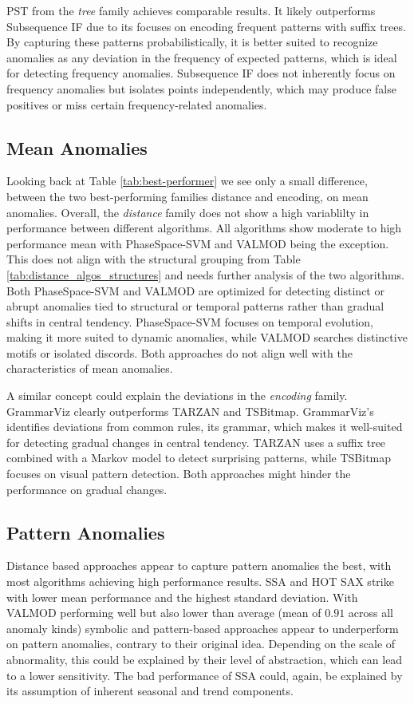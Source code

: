     PST from the \textit{tree} family achieves comparable results. It likely outperforms Subsequence IF due to its focuses on encoding frequent patterns with suffix trees. By capturing these patterns probabilistically, it is better suited to recognize anomalies as any deviation in the frequency of expected patterns, which is ideal for detecting frequency anomalies. Subsequence IF does not inherently focus on frequency anomalies but isolates points independently, which may produce false positives or miss certain frequency-related anomalies.
    
\subsection{Mean Anomalies} 
    
    Looking back at Table \ref{tab:best-performer} we see only a small difference, between the two best-performing families distance and encoding, on mean anomalies.
    Overall, the \textit{distance} family does not show a high variablilty in performance between different algorithms. All algorithms show moderate to high performance mean with PhaseSpace-SVM and VALMOD being the exception. This does not align with the structural grouping from Table \ref{tab:distance_algos_structures} and needs further analysis of the two algorithms. Both PhaseSpace-SVM and VALMOD are optimized for detecting distinct or abrupt anomalies tied to structural or temporal patterns rather than gradual shifts in central tendency. PhaseSpace-SVM focuses on temporal evolution, making it more suited to dynamic anomalies, while VALMOD searches distinctive motifs or isolated discords. Both approaches do not align well with the characteristics of mean anomalies.
    
    A similar concept could explain the deviations in the \textit{encoding} family. GrammarViz clearly outperforms TARZAN and TSBitmap. GrammarViz’s identifies deviations from common rules, its grammar, which makes it well-suited for detecting gradual changes in central tendency. TARZAN uses a suffix tree combined with a Markov model to detect surprising patterns, while TSBitmap focuses on visual pattern detection. Both approaches might hinder the performance on gradual changes.
    
\subsection{Pattern Anomalies}
    
    Distance based approaches appear to capture pattern anomalies the best, with most  algorithms achieving high performance results. SSA and HOT SAX strike with lower mean performance and the highest standard deviation.
    With VALMOD performing well but also lower than average (mean of $0.91$ across all anomaly kinds) symbolic and pattern-based approaches appear to underperform on pattern anomalies, contrary to their original idea. Depending on the scale of abnormality, this could be explained by their level of abstraction, which can lead to a lower sensitivity.
    The bad performance of SSA could, again, be explained by its assumption of inherent seasonal and trend components.
    
